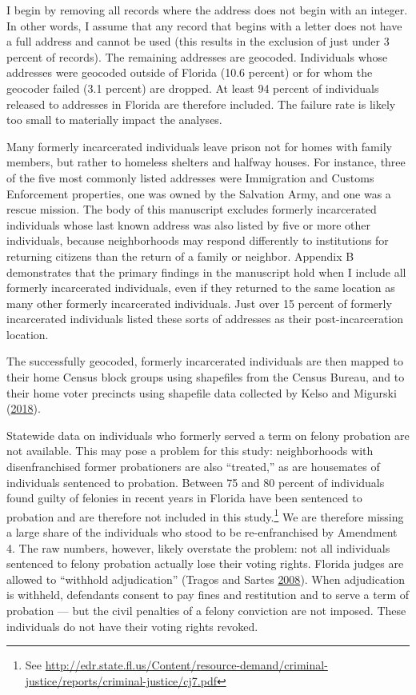 \documentclass[
  12pt,
]{article}
\begin{document}
I begin by removing all records where the address does not begin with an integer. In other words, I assume that any record that begins with a letter does not have a full address and cannot be used (this results in the exclusion of just under 3 percent of records). The remaining addresses are geocoded. Individuals whose addresses were geocoded outside of Florida (10.6 percent) or for whom the geocoder failed (3.1 percent) are dropped. At least 94 percent of individuals released to addresses in Florida are therefore included. The failure rate is likely too small to materially impact the analyses.

Many formerly incarcerated individuals leave prison not for homes with family members, but rather to homeless shelters and halfway houses. For instance, three of the five most commonly listed addresses were Immigration and Customs Enforcement properties, one was owned by the Salvation Army, and one was a rescue mission. The body of this manuscript excludes formerly incarcerated individuals whose last known address was also listed by five or more other individuals, because neighborhoods may respond differently to institutions for returning citizens than the return of a family or neighbor. Appendix B demonstrates that the primary findings in the manuscript hold when I include all formerly incarcerated individuals, even if they returned to the same location as many other formerly incarcerated individuals. Just over 15 percent of formerly incarcerated individuals listed these sorts of addresses as their post-incarceration location.

The successfully geocoded, formerly incarcerated individuals are then mapped to their home Census block groups using shapefiles from the Census Bureau, and to their home voter precincts using shapefile data collected by Kelso and Migurski (\protect\hyperlink{ref-Kelso2018}{2018}).

Statewide data on individuals who formerly served a term on felony probation are not available. This may pose a problem for this study: neighborhoods with disenfranchised former probationers are also ``treated,'' as are housemates of individuals sentenced to probation. Between 75 and 80 percent of individuals found guilty of felonies in recent years in Florida have been sentenced to probation and are therefore not included in this study.\footnote{See \url{http://edr.state.fl.us/Content/resource-demand/criminal-justice/reports/criminal-justice/cj7.pdf}} We are therefore missing a large share of the individuals who stood to be re-enfranchised by Amendment 4. The raw numbers, however, likely overstate the problem: not all individuals sentenced to felony probation actually lose their voting rights. Florida judges are allowed to ``withhold adjudication'' (Tragos and Sartes \protect\hyperlink{ref-Tragos2008}{2008}). When adjudication is withheld, defendants consent to pay fines and restitution and to serve a term of probation --- but the civil penalties of a felony conviction are not imposed. These individuals do not have their voting rights revoked.
\end{document}
